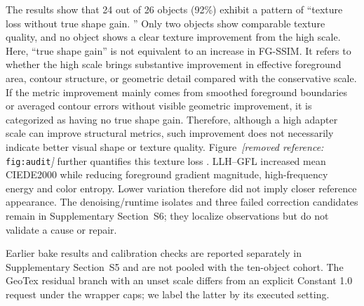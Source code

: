 \documentclass[times,twocolumn,final]{elsarticle}
\providecommand{\DIFadd}[1]{{\protect\color{blue} \sf #1}} %
\providecommand{\DIFdel}[1]{{\protect\color{red} \scriptsize #1}} %
\providecommand{\DIFaddbegin}{} %
\providecommand{\DIFaddend}{} %
\providecommand{\DIFdelbegin}{} %
\providecommand{\DIFdelend}{} %
\begin{document}
\DIFdel{The results show that 24 out of 26 objects (92\%) exhibit a pattern of ``texture loss without true shape gain.
'' Only two objects show comparable texture quality, and no object shows a clear texture improvement from the high scale. Here, ``true shape gain'' is not equivalent to an increase in FG-SSIM.
It refers to whether the high scale brings substantive improvement in effective foreground area, contour structure, or geometric detail compared with the conservative scale. If the metric improvement mainly comes from smoothed foreground boundaries or averaged contour errors without visible geometric improvement, it is categorized as having no true shape gain. Therefore, although a high adapter scale can improve structural metrics, such improvement does not necessarily indicate better visual shape or texture quality. Figure~\textit{[removed reference: }\texttt{fig:audit}\textit{]} further quantifies this texture loss .
}\DIFdelend \DIFaddbegin \DIFadd{LLH--GFL increased mean CIEDE2000 while reducing foreground gradient magnitude, high-frequency energy and color entropy. Lower variation therefore did not imply closer reference appearance. The denoising/runtime isolates and three failed correction candidates remain in Supplementary Section~S6; they localize observations but do not validate a cause or repair.
}\DIFaddend

\DIFdelbegin %
\DIFdelend \DIFaddbegin \DIFadd{Earlier bake results and calibration checks are reported separately in Supplementary Section~S5 and are not pooled with the ten-object cohort. The GeoTex residual branch with an unset scale differs from an explicit Constant 1.0 request under the wrapper caps; we label the latter by its executed setting.
}\DIFaddend
\end{document}
